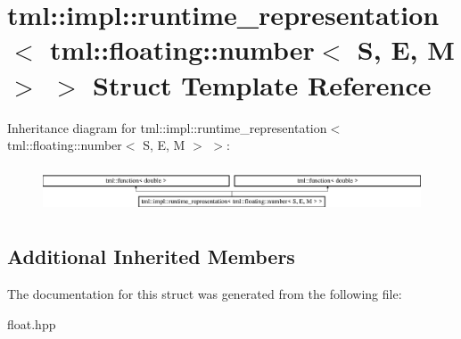 \hypertarget{structtml_1_1impl_1_1runtime__representation_3_01tml_1_1floating_1_1number_3_01S_00_01E_00_01M_01_4_01_4}{\section{tml\+:\+:impl\+:\+:runtime\+\_\+representation$<$ tml\+:\+:floating\+:\+:number$<$ S, E, M $>$ $>$ Struct Template Reference}
\label{structtml_1_1impl_1_1runtime__representation_3_01tml_1_1floating_1_1number_3_01S_00_01E_00_01M_01_4_01_4}
}
Inheritance diagram for tml\+:\+:impl\+:\+:runtime\+\_\+representation$<$ tml\+:\+:floating\+:\+:number$<$ S, E, M $>$ $>$\+:\begin{figure}[H]
\begin{center}
\leavevmode
\includegraphics[height=1.396509cm]{structtml_1_1impl_1_1runtime__representation_3_01tml_1_1floating_1_1number_3_01S_00_01E_00_01M_01_4_01_4}
\end{center}
\end{figure}
\subsection*{Additional Inherited Members}


The documentation for this struct was generated from the following file\+:\begin{DoxyCompactItemize}
\item 
float.\+hpp\end{DoxyCompactItemize}
